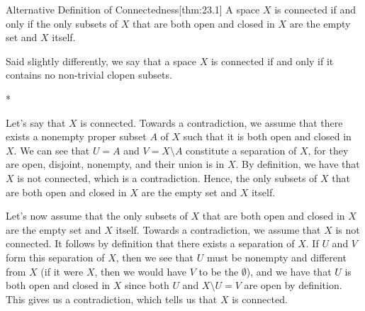 \begin{thmBox}{Alternative Definition of Connectedness}[thm:23.1]
    A space \( X \) is connected if and only if the only subsets of \( X \) that
    are both open and closed in \( X \) are the empty set and \( X \) itself.

    \baseSkip

    Said slightly differently, we say that a space \( X \) is connected if and 
    only if it contains no non-trivial clopen subsets.

    \baseRule

    \begin{proofBox}*
        \wrapBox{\( \implies \)}

        Let's say that \( X \) is connected.
        Towards a contradiction, we assume that there exists a nonempty 
        proper subset \( A \) of \( X \) such that it is both open and closed in \( X \).
        We can see that \( U = A \) and \( V = X \setminus A \) constitute
        a separation of \( X \), for they are open, disjoint, nonempty,
        and their union is in \( X \).
        By definition, we have that \( X \) is not connected, which is a 
        contradiction.
        Hence, the only subsets of \( X \) that
        are both open and closed in \( X \) are the empty set and \( X \) itself.

        \baseSkip 

        \wrapBox{\( \impliedby \)}

        Let's now assume that the only subsets of \( X \) that
        are both open and closed in \( X \) are the empty set and \( X \) itself.
        Towards a contradiction, we assume that \( X \) is not connected.
        It follows by definition that there exists a separation of \( X \).
        If \( U \) and \( V \) form this separation of \( X \), then we see that
        \( U \) must be nonempty and different from \( X \) (if it were \( X \),
        then we would have \( V \) to be the \( \emptyset \)), and we have that 
        \( U \) is both open and closed in \( X \) since both \( U \) and \( X 
        \setminus U = V \) are open by definition.
        This gives us a contradiction, which tells us that \( X \) is 
        connected.
    \end{proofBox}
\end{thmBox}

